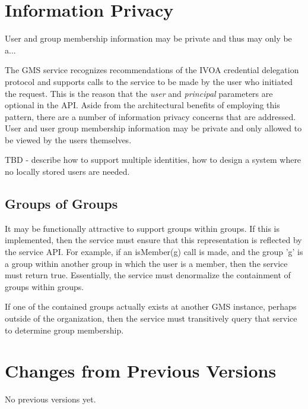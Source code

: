 \documentclass[11pt,a4paper]{ivoa}
\begin{document}
\section{Information Privacy}

User and group membership information may be private and thus may only be a...

The GMS service recognizes recommendations of the IVOA credential delegation protocol \citep{std:CDP} and supports calls to the service to be made by the user who initiated the request.  This is the reason that the \emph{user} and \emph{principal} parameters are optional in the API.  Aside from the architectural benefits of employing this pattern, there are a number of information privacy concerns that are addressed.  User and user group membership information may be private and only allowed to be viewed by the users themselves.

TBD - describe how to support multiple identities, how to design a system where no locally stored users are needed.

\subsection{Groups of Groups}

It may be functionally attractive to support groups within groups.  If this is implemented, then the service must ensure that this representation is reflected by the service API.  For example, if an isMember(g) call is made, and the group 'g' is a group within another group in which the user is a member, then the service must return true.  Essentially, the service must denormalize the containment of groups within groups.

If one of the contained groups actually exists at another GMS instance, perhaps outside of the organization, then the service must transitively query that service to determine group membership.

\appendix

\section{Changes from Previous Versions}

No previous versions yet.



\end{document}
